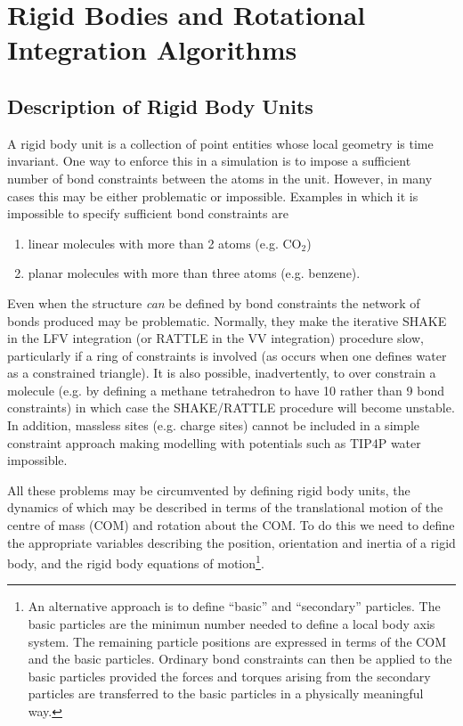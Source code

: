 \section{Rigid Bodies and Rotational Integration Algorithms}
\label{rigid}

\subsection{Description of Rigid Body Units}

A rigid body unit is a collection of point entities whose local geometry
is time invariant.  One way to enforce this in a simulation is to
impose a sufficient number of bond constraints between the atoms in
the unit.  However, in many cases this may be either problematic or
impossible.  Examples in which it is impossible to specify sufficient
bond constraints are
\begin{enumerate}
\item linear molecules with more than 2 atoms (e.g. CO$_2$)
\item planar molecules with more than three atoms (e.g. benzene).
\end{enumerate}
Even when the structure {\em can} be defined by bond
constraints the network of bonds produced
may be problematic.  Normally, they make the iterative SHAKE in the
LFV integration (or RATTLE in the VV integration) procedure slow,
particularly if a ring of constraints is involved (as occurs when
one defines water as a constrained triangle).  It is also possible,
inadvertently, to over constrain a molecule (e.g. by defining a
methane tetrahedron to have 10 rather than 9 bond constraints)
in which case the SHAKE/RATTLE procedure will become unstable.
In addition, massless sites (e.g. charge sites) cannot be included
in a simple constraint approach making modelling with potentials
such as TIP4P water impossible.

All these problems may be circumvented by defining rigid body
units, the dynamics of which may be described in terms of
the translational motion of the centre of mass (COM) and rotation
about the COM. To do this we need to define the appropriate variables
describing the position, orientation and inertia of a
rigid body, and the rigid body
equations of motion\footnote{An alternative approach is to define
``basic'' and ``secondary'' particles.  The basic particles are the
minimun number needed to define a local body axis system.  The
remaining particle positions are expressed in terms of the COM and
the basic particles. Ordinary bond constraints
can then be applied to the basic particles provided the forces
and torques arising from the secondary particles are transferred
to the basic particles in a physically meaningful way.}.

